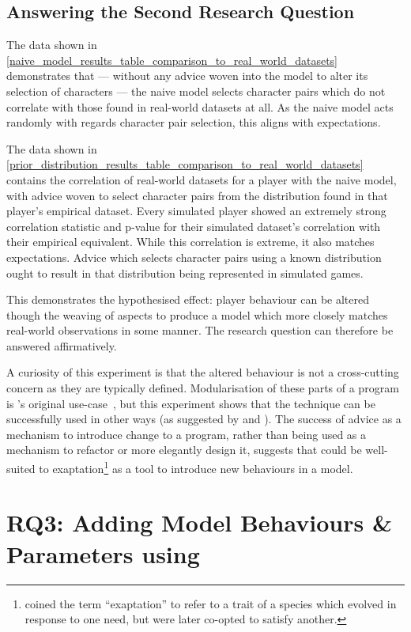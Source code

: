 \subsection{Answering the Second Research Question}

The data shown in
\cref{naive_model_results_table_comparison_to_real_world_datasets} demonstrates
that --- without any advice woven into the model to alter its selection of
characters --- the naive model selects character pairs which do not correlate
with those found in real-world datasets at all. As the naive model acts randomly
with regards character pair selection, this aligns with expectations.

The data shown in
\cref{prior_distribution_results_table_comparison_to_real_world_datasets}
contains the correlation of real-world datasets for a player with the naive
model, with advice woven to select character pairs from the distribution found
in that player's empirical dataset. Every simulated player showed an
extremely strong correlation statistic and p-value for their simulated dataset's
correlation with their empirical equivalent. While this correlation is extreme,
it also matches expectations. Advice which selects character pairs using a known
distribution ought to result in that distribution being represented in
simulated games.

This demonstrates the hypothesised effect: player behaviour can be altered
though the weaving of aspects to produce a model which more closely matches
real-world observations in some manner. The research question can therefore be
answered affirmatively.

A curiosity of this experiment is that the altered behaviour is not a
cross-cutting concern as they are typically defined. Modularisation of these
parts of a program is \aop{}'s original use-case~\cite{kiczales1997aspect}, but
this experiment shows that the technique can be successfully used in other ways
(as suggested by \citet{gulyas1999use} and \citet{steimann06paradoxical}). The
success of advice as a mechanism to introduce change to a program, rather than
being used as a mechanism to refactor or more elegantly design it, suggests that
\aop{} could be well-suited to exaptation\footnote{\citet{exaptation_origin}
coined the term ``exaptation'' to refer to a trait of a species which evolved in
response to one need, but were later co-opted to satisfy another.} as a tool to
introduce new behaviours in a model.



\section{RQ3: Adding Model Behaviours \& Parameters using \AspectOrientation}
\label{sec:rq3}

